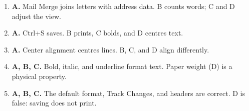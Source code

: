 \documentclass[11pt]{article}
\begin{document}
\begin{enumerate}[label=\textbf{Q\arabic*.}, leftmargin=*]
\item \textbf{A.} Mail Merge joins letters with address data. B counts words; C and D adjust the view.
\item \textbf{A.} Ctrl+S saves. B prints, C bolds, and D centres text.
\item \textbf{A.} Center alignment centres lines. B, C, and D align differently.
\item \textbf{A, B, C.} Bold, italic, and underline format text. Paper weight (D) is a physical property.
\item \textbf{A, B, C.} The default format, Track Changes, and headers are correct. D is false: saving does not print.
\end{enumerate}
\def\JKSSBLessonID{22}
\def\JKSSBAnswers{1}

\end{document}

